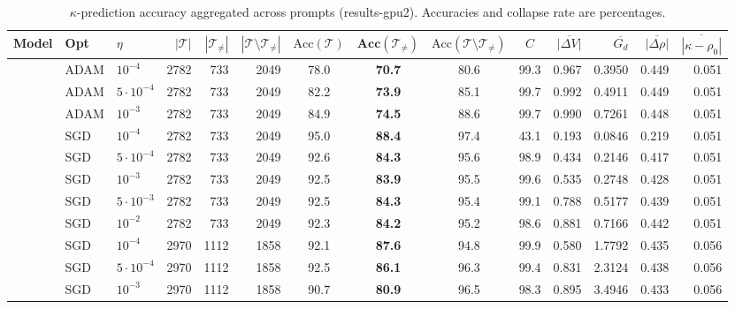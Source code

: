 \begin{landscape}
\begin{table}[p]
\centering
\caption{$\kappa$-prediction accuracy aggregated across prompts (results-gpu2).
         Accuracies and collapse rate are percentages.}
\label{tab:gpu2-results}
\small
\begin{tabular}{lll|rrr|cccc|rrrr}
\toprule
Model & Opt & $\eta$ & $|\mathcal{T}|$ & $|\mathcal{T}_{\neq}|$ & $|\mathcal{T} \setminus \mathcal{T}_{\neq}|$ & $\text{Acc}(\mathcal{T})$ & $\textbf{Acc}(\boldsymbol{\mathcal{T}_{\neq}})$ & $\text{Acc}(\mathcal{T} \setminus \mathcal{T}_{\neq})$ & $C$ & $\overline{|\Delta V|}$ & $\overline{G_d}$ & $\overline{|\Delta\rho|}$ & $\overline{|\kappa{-}\rho_0|}$ \\
\midrule
{} & ADAM & $10^{-4}$ & 2782 & 733 & 2049 & 78.0 & \textbf{70.7} & 80.6 & 99.3 & 0.967 & 0.3950 & 0.449 & 0.051 \\
 & ADAM & $5 \cdot 10^{-4}$ & 2782 & 733 & 2049 & 82.2 & \textbf{73.9} & 85.1 & 99.7 & 0.992 & 0.4911 & 0.449 & 0.051 \\
 & ADAM & $10^{-3}$ & 2782 & 733 & 2049 & 84.9 & \textbf{74.5} & 88.6 & 99.7 & 0.990 & 0.7261 & 0.448 & 0.051 \\
\cmidrule(lr){2-14}
 & SGD & $10^{-4}$ & 2782 & 733 & 2049 & 95.0 & \textbf{88.4} & 97.4 & 43.1 & 0.193 & 0.0846 & 0.219 & 0.051 \\
 & SGD & $5 \cdot 10^{-4}$ & 2782 & 733 & 2049 & 92.6 & \textbf{84.3} & 95.6 & 98.9 & 0.434 & 0.2146 & 0.417 & 0.051 \\
 & SGD & $10^{-3}$ & 2782 & 733 & 2049 & 92.5 & \textbf{83.9} & 95.5 & 99.6 & 0.535 & 0.2748 & 0.428 & 0.051 \\
 & SGD & $5 \cdot 10^{-3}$ & 2782 & 733 & 2049 & 92.5 & \textbf{84.3} & 95.4 & 99.1 & 0.788 & 0.5177 & 0.439 & 0.051 \\
 & SGD & $10^{-2}$ & 2782 & 733 & 2049 & 92.3 & \textbf{84.2} & 95.2 & 98.6 & 0.881 & 0.7166 & 0.442 & 0.051 \\
\midrule
{} & SGD & $10^{-4}$ & 2970 & 1112 & 1858 & 92.1 & \textbf{87.6} & 94.8 & 99.9 & 0.580 & 1.7792 & 0.435 & 0.056 \\
 & SGD & $5 \cdot 10^{-4}$ & 2970 & 1112 & 1858 & 92.5 & \textbf{86.1} & 96.3 & 99.4 & 0.831 & 2.3124 & 0.438 & 0.056 \\
 & SGD & $10^{-3}$ & 2970 & 1112 & 1858 & 90.7 & \textbf{80.9} & 96.5 & 98.3 & 0.895 & 3.4946 & 0.433 & 0.056 \\

\end{tabular}
\end{table}
\end{landscape}
